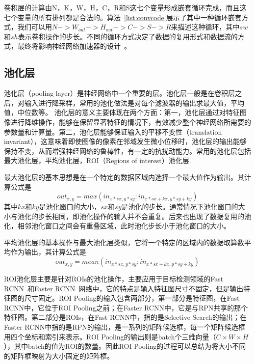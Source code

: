 卷积层的计算由N，K，W，H，C，R和S这七个变量形成嵌套循环完成，而且这七个变量的所有排列都是合法的。算法~\ref{list:convcode}展示了其中一种循环嵌套方式，我们可以用$N->W_{out}->H_{out}->C->S->R$来描述这种循环，其中$sw$和$sh$表示卷积操作的步长。不同的循环方式决定了数据的复用形式和数据流的方式，最终将影响神经网络加速器的设计~\cite{angshuman2017scnn}。

\subsection{池化层}
池化层（pooling layer）是神经网络中一个重要的层。池化层一般是在卷积层之后，对输入进行降采样，常用的池化做法是对每个滤波器的输出求最大值，平均值，中位数等。
池化层的意义主要体现在两个方面：第一，池化层通过对特征图像进行降维操作，能够在保留显著特征的情况下，有效减少整个神经网络所需要的参数量和计算量。第二，池化层能够保证输入的平移不变性（translation invariant），这意味着即使图像的像素在邻域发生微小位移时，池化层的输出能够保持不变，从而增强神经网络的鲁棒性，有一定的抗扰动能力。常用的池化层包括最大池化层，平均池化层，ROI（Regions of interest）池化层.

最大池化层的基本思想是在一个特定的数据区域内选择一个最大值作为输出。其计算公式是
\begin{equation}
out_{x,y} = max(in_{x*sx,y*sy}:in_{x*sx+kx,y*sy+ky})
\end{equation}
其中$kx$和$ky$是池化窗口的大小，$sx$和$sy$是池化的步长。通常情况下池化窗口的大小与池化的步长相同，即池化操作的输入并不会重复。后来也出现了数据复用的池化，相邻池化窗口之间会有重叠区域，此时池化步长小于池化窗口的大小。


平均池化层的基本操作与最大池化层类似，它将一个特定的区域内的数据取算数平均作为输出，其计算公式是
\begin{equation}
out_{x,y}=mean(in_{x*sx,y*sy}:in_{x*sx+kx,y*sy+ky})
\end{equation}

ROI池化层主要是针对ROIs的池化操作，主要应用于目标检测领域的Fast RCNN~\cite{girshick2014rich}和Faster RCNN~\cite{ren2015faster}网络中，它的特点是输入特征图尺寸不固定，但是输出特征图的尺寸固定。ROI Pooling的输入包含两部分，第一部分是特征图，在Fast RCNN中，它位于ROI Pooling之前；在Faster RCNN中，它是与RPN共享的那个特征图。第二部分是ROIs，在Fast RCNN中，指的是Selective Search的输出；在Faster RCNN中指的是RPN的输出，是一系列的矩阵候选框，每一个矩阵候选框用四个坐标和索引来表示。ROI Pooling的输出则是batch个三维向量（$C \times W\times H$），其中batch的值为ROI的数量。因此ROI Pooling的过程可以总结为将大小不同的矩阵框映射为大小固定的矩阵框。
 

